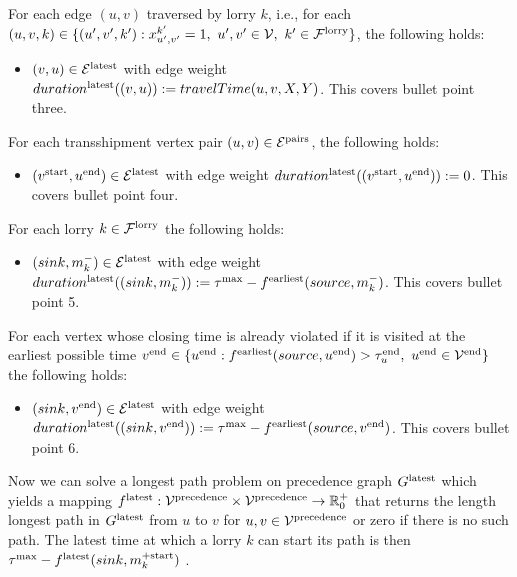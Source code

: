 For each edge $(u,v)$ traversed by lorry $k$, i.e., for each
 $(u,v,k) \in  \{ (u',v',k') : x^{k'}_{u',v'} = 1,
\ u',v' \in \mathcal V,
\ k' \in \mathcal F^{\rm lorry} \}$,
the following holds:
\begin{itemize}
  \item
  $(v,u) \in \mathcal E^{\rm latest}$
  with edge weight
  $duration^{\rm latest}((v,u)) := travelTime(u,v,X,Y)$.
  This covers bullet point three.
\end{itemize}


For each transshipment vertex pair $(u,v) \in \mathcal E^{\rm pairs}$,
the following holds:
\begin{itemize}
  \item
    $(v^{\rm start}, u^{\rm end}) \in \mathcal E^{\rm latest}$
    with edge weight
    $duration^{\rm latest}((v^{\rm start}, u^{\rm end})) := 0$.
    This covers bullet point four.
\end{itemize}

For each lorry $k \in \mathcal F^{\rm lorry} $
the following holds:
\begin{itemize}
  \item
  $( sink,m^-_k)  \in \mathcal E^{\rm latest} $
  with edge weight
    $duration^{\rm latest}(( sink,m^-_k) ) := \tau^{\rm max} - f^{\rm earliest}(source,m^-_k) $.
    This covers bullet point 5.
\end{itemize}

For each vertex whose closing time is already violated if it is visited at the earliest possible time
$ v^{\rm end} \in \{ u^{\rm end} :f^{\rm earliest}(source,u^{\rm end} ) > \tau^{\rm end}_u
, \ u^{\rm end} \in \mathcal V^{\rm end} \}$
the following holds:
\begin{itemize}
  \item
  $( sink,v^{\rm end})  \in \mathcal E^{\rm latest} $
  with edge weight
    $duration^{\rm latest}(( sink,v^{\rm end})) := \tau^{\rm max} - f^{\rm earliest}(source,v^{\rm end}) $.
    This covers bullet point 6.
\end{itemize}

Now we can solve a  longest path problem on precedence graph
$G^{\rm latest}$
which yields a mapping
$f^{\rm latest}: \mathcal V^{\rm precedence} \times \mathcal V^{\rm precedence} \rightarrow \mathbb{R}^+_0$
that returns the length longest path in $G^{\rm latest}$ from $u$ to $v$ for  $u,v \in \mathcal V^{\rm precedence}$ or zero if there is no such path.
The latest time at which a lorry $k$ can start its path is then $\tau^{\rm max} - f^{\rm latest}(sink,m^{+ \rm start}_k)$ . \\


